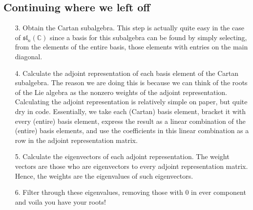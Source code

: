 \documentclass[12pt]{article}
\theoremstyle{definition}
\theoremstyle{definition}
\begin{document}
    \subsection{Continuing where we left off}
    \begin{enumerate}
        \item[3.] Obtain the Cartan subalgebra. This step is actually quite
            easy in the case of $\mathfrak{sl}_n(\mathbb{C})$ since a basis for this
            subalgebra can be found by simply selecting, from the elements of the
            entire basis, those elements with entries on the main diagonal.
        \item[4.] Calculate the adjoint representation of each basis element of
            the Cartan subalgebra. The reason we are doing this is because we
            can think of the roots of the Lie algebra as the nonzero weights of
            the adjoint representation. Calculating the adjoint representation
            is relatively simple on paper, but quite dry in code. Essentially,
            we take each (Cartan) basis element, bracket it with every (entire)
            basis element, express the result as a linear combination of the
            (entire) basis elements, and use the coefficients in this linear
            combination as a row in the adjoint representation matrix.
        \item[5.] Calculate the eigenvectors of each adjoint representation.
            The weight vectors are those who are eigenvectors to every adjoint
            representation matrix. Hence, the weights are the eigenvalues of
            such eigenvectors.
        \item[6.] Filter through these eigenvalues, removing those with 0 in
            ever component and voila you have your roots!
    \end{enumerate}  
\end{document}
